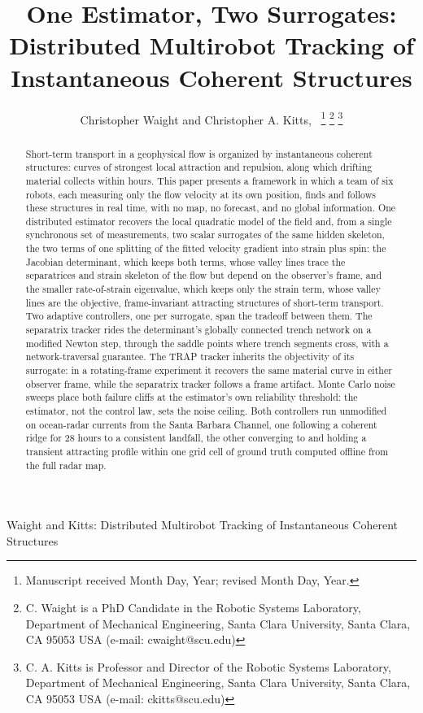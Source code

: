 \documentclass[lettersize,journal]{IEEEtran}
\begin{document}
\title{One Estimator, Two Surrogates: Distributed Multirobot Tracking of
Instantaneous Coherent Structures}

\author{Christopher Waight and Christopher A. Kitts,~
\thanks{Manuscript received Month Day, Year; revised Month Day, Year.}
\thanks{C. Waight is a PhD Candidate in the Robotic Systems Laboratory, Department of Mechanical
Engineering, Santa Clara University, Santa Clara, CA 95053 USA (e-mail: cwaight@scu.edu)}
\thanks{C. A. Kitts is Professor and Director of the Robotic Systems Laboratory, Department of
Mechanical Engineering, Santa Clara University, Santa Clara, CA 95053 USA (e-mail: ckitts@scu.edu)}
}
%
{Waight and Kitts: Distributed Multirobot Tracking of Instantaneous Coherent Structures}

\maketitle

\begin{abstract}
Short-term transport in a geophysical flow is organized by instantaneous
coherent structures: curves of strongest local attraction and repulsion,
along which drifting material collects within hours. This paper presents
a framework in which a team of six robots, each measuring only the flow
velocity at its own position, finds and follows these structures in real
time, with no map, no forecast, and no global information. One
distributed estimator recovers the local quadratic model of the field
and, from a single synchronous set of measurements, two scalar
surrogates of the same hidden skeleton, the two terms of one splitting
of the fitted velocity gradient into strain plus spin: the Jacobian
determinant, which keeps both terms, whose valley lines trace the
separatrices and strain skeleton of the flow but depend on the
observer's frame, and the smaller rate-of-strain eigenvalue, which
keeps only the strain term, whose valley lines are the objective,
frame-invariant attracting structures of short-term transport. Two
adaptive controllers, one per surrogate, span the tradeoff between them.
The separatrix tracker rides the determinant's globally connected trench
network on a modified Newton step, through the saddle points where
trench segments cross, with a network-traversal guarantee. The TRAP
tracker inherits the objectivity of its surrogate: in a rotating-frame
experiment it recovers the same material curve in either observer frame,
while the separatrix tracker follows a frame artifact. Monte Carlo noise
sweeps place both failure cliffs at the estimator's own reliability
threshold: the estimator, not the control law, sets the noise ceiling.
Both controllers run unmodified on ocean-radar currents from the Santa
Barbara Channel, one following a coherent ridge for 28 hours to a
consistent landfall, the other converging to and holding a transient
attracting profile within one grid cell of ground truth computed offline
from the full radar map.
\end{abstract}
\end{document}
